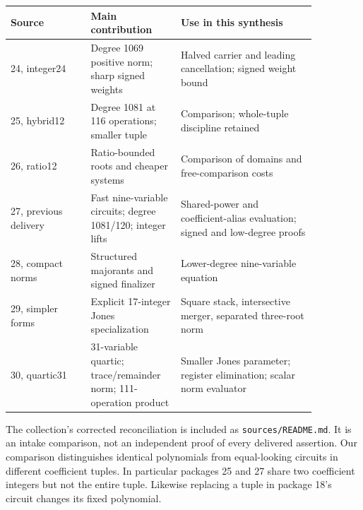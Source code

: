 \documentclass[11pt]{article}
\begin{document}
\begin{center}\small
\begin{tabular}{p{0.23\linewidth}p{0.24\linewidth}p{0.39\linewidth}}
\toprule
Source & Main contribution & Use in this synthesis\\\midrule
24, integer24 & Degree 1069 positive norm; sharp signed weights & Halved carrier and leading cancellation; signed weight bound\\
25, hybrid12 & Degree 1081 at 116 operations; smaller tuple & Comparison; whole-tuple discipline retained\\
26, ratio12 & Ratio-bounded roots and cheaper systems & Comparison of domains and free-comparison costs\\
27, previous delivery & Fast nine-variable circuits; degree 1081/120; integer lifts & Shared-power and coefficient-alias evaluation; signed and low-degree proofs\\
28, compact norms & Structured majorants and signed finalizer & Lower-degree nine-variable equation\\
29, simpler forms & Explicit 17-integer Jones specialization & Square stack, intersective merger, separated three-root norm\\
30, quartic31 & 31-variable quartic; trace/remainder norm; 111-operation product & Smaller Jones parameter; register elimination; scalar norm evaluator\\\bottomrule
\end{tabular}
\end{center}
The collection's corrected reconciliation is included as \texttt{sources/README.md}. It is an intake comparison, not an independent proof of every delivered assertion. Our comparison distinguishes identical polynomials from equal-looking circuits in different coefficient tuples. In particular packages 25 and 27 share two coefficient integers but not the entire tuple. Likewise replacing a tuple in package 18's circuit changes its fixed polynomial.
\end{document}
